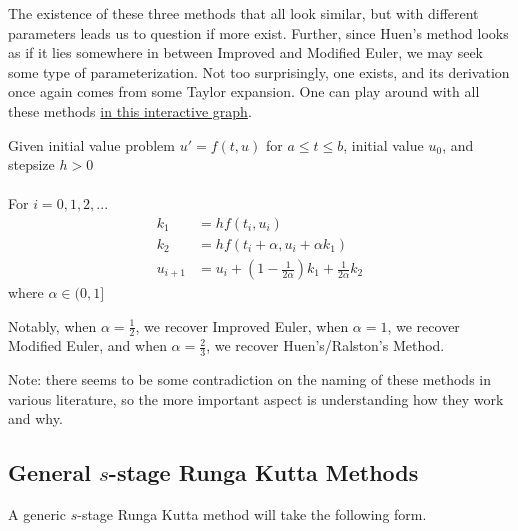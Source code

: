 \documentclass[11pt]{article}
\begin{document}
The existence of these three methods that all look similar, but with different parameters leads us to question if more exist. Further, since Huen's method looks as if it lies somewhere in between Improved and Modified Euler, we may seek some type of parameterization. Not too surprisingly, one exists, and its derivation once again comes from some Taylor expansion. One can play around with all these methods {\color{blue}\href{https://www.desmos.com/calculator/klapw9uire}{in this interactive graph}}.

\begin{algo}
    Given initial value problem $u' = f(t,u)$ for $a \leq t \leq b$, initial value $u_0$, and stepsize $h > 0$\\ \\
    For $i = 0, 1, 2, ...$
   \begin{align*}
        k_1 &= hf(t_i, u_i)\\
        k_2 &= hf(t_i + \alpha, u_i + \alpha k_1)\\
        u_{i+1} &= u_i + (1-\tfrac{1}{2\alpha})k_1 +
       \tfrac{1}{2\alpha}k_2
   \end{align*}
   where $\alpha \in (0,1]$
\end{algo}
Notably, when $\alpha = \tfrac{1}{2}$, we recover Improved Euler, when $\alpha = 1$, we recover Modified Euler, and when $\alpha = \tfrac{2}{3}$, we recover Huen's/Ralston's Method.

\begin{remark}
    Note: there seems to be some contradiction on the naming of these methods in various literature, so the more important aspect is understanding how they work and why. 
\end{remark}


\subsection{General $s$-stage Runga Kutta Methods}


A generic $s$-stage Runga Kutta method will take the following form.
\end{document}
